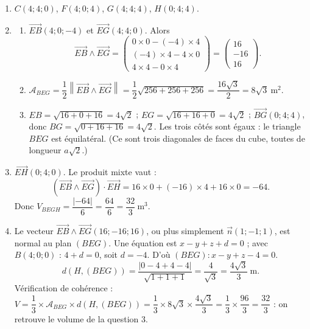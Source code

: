 \documentclass[11pt]{article}
\begin{document}
\begin{corrige}
\begin{enumerate}
\item $C(4 ; 4 ; 0)$, $F(4 ; 0 ; 4)$, $G(4 ; 4 ; 4)$, $H(0 ; 4 ; 4)$.
\item \begin{enumerate}
\item $\overrightarrow{EB}(4 ; 0 ; -4)$ et $\overrightarrow{EG}(4 ; 4 ; 0)$. Alors
\[ \overrightarrow{EB} \wedge \overrightarrow{EG} = \begin{pmatrix} 0\times 0 - (-4)\times 4 \\ (-4)\times 4 - 4\times 0 \\ 4\times 4 - 0\times 4 \end{pmatrix} = \begin{pmatrix} 16 \\ -16 \\ 16 \end{pmatrix}. \]
\item $\mathcal{A}_{BEG} = \dfrac{1}{2}\left\|\overrightarrow{EB} \wedge \overrightarrow{EG}\right\| = \dfrac{1}{2}\sqrt{256 + 256 + 256} = \dfrac{16\sqrt{3}}{2} = 8\sqrt{3} \ \mathrm{m}^2$.
\item $EB = \sqrt{16 + 0 + 16} = 4\sqrt{2}$ ; $EG = \sqrt{16 + 16 + 0} = 4\sqrt{2}$ ; $\overrightarrow{BG}(0 ; 4 ; 4)$, donc $BG = \sqrt{0 + 16 + 16} = 4\sqrt{2}$. Les trois côtés sont égaux : le triangle $BEG$ est équilatéral. (Ce sont trois diagonales de faces du cube, toutes de longueur $a\sqrt{2}$.)
\end{enumerate}
\item $\overrightarrow{EH}(0 ; 4 ; 0)$. Le produit mixte vaut :
\[ \left(\overrightarrow{EB} \wedge \overrightarrow{EG}\right) \cdot \overrightarrow{EH} = 16\times 0 + (-16)\times 4 + 16\times 0 = -64. \]
Donc $V_{BEGH} = \dfrac{|-64|}{6} = \dfrac{64}{6} = \dfrac{32}{3} \ \mathrm{m}^3$.
\item Le vecteur $\overrightarrow{EB} \wedge \overrightarrow{EG}(16 ; -16 ; 16)$, ou plus simplement $\vec{n}(1 ; -1 ; 1)$, est normal au plan $(BEG)$. Une équation est $x - y + z + d = 0$ ; avec $B(4 ; 0 ; 0)$ : $4 + d = 0$, soit $d = -4$. D'où $(BEG) : x - y + z - 4 = 0$.
\[ d(H, (BEG)) = \dfrac{|0 - 4 + 4 - 4|}{\sqrt{1 + 1 + 1}} = \dfrac{4}{\sqrt{3}} = \dfrac{4\sqrt{3}}{3} \ \mathrm{m}. \]
Vérification de cohérence : $V = \dfrac{1}{3} \times \mathcal{A}_{BEG} \times d(H, (BEG)) = \dfrac{1}{3} \times 8\sqrt{3} \times \dfrac{4\sqrt{3}}{3} = \dfrac{1}{3} \times \dfrac{96}{3} = \dfrac{32}{3}$ : on retrouve le volume de la question 3.

\end{enumerate}
\end{corrige}
\end{document}
